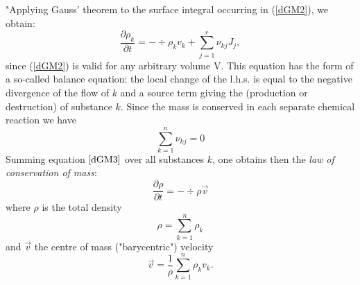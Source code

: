 "Applying Gauss' theorem to the surface integral occurring in (\ref{dGM2}), we obtain:
\begin{equation}
\frac{\partial \rho_k}{\partial t} = - \div \rho_k v_k + \sum_{j=1}^r \nu_{kj} J_j,
\label{dGM3}
\end{equation}
since (\ref{dGM2}) is valid for any arbitrary volume V. This equation has the form of a so-called balance equation: the local change of the l.h.s. is equal to the negative divergence of the flow of $k$ and a source term giving the (production or destruction) of substance $k$.
Since the mass is conserved in each separate chemical reaction we have
\begin{equation}
\sum_{k=1}^n \nu_{kj}= 0 
\end{equation}
Summing equation $\ref{dGM3}$ over all substances $k$, one obtains then the {\it law of conservation of mass}:
\begin{equation}
\frac{\partial \rho}{\partial t} = - \div \rho \vec{v}
\label{dGM5}
\end{equation}
where $\rho$ is the total density
\begin{equation}
\rho = \sum_{k=1}^n \rho_k
\end{equation}
and $\vec{v}$ the centre of mass ("barycentric") velocity
\begin{equation}
\vec{v} = \frac{1}{\rho} \sum_{k=1}^n \rho_k v_k.
\end{equation}
